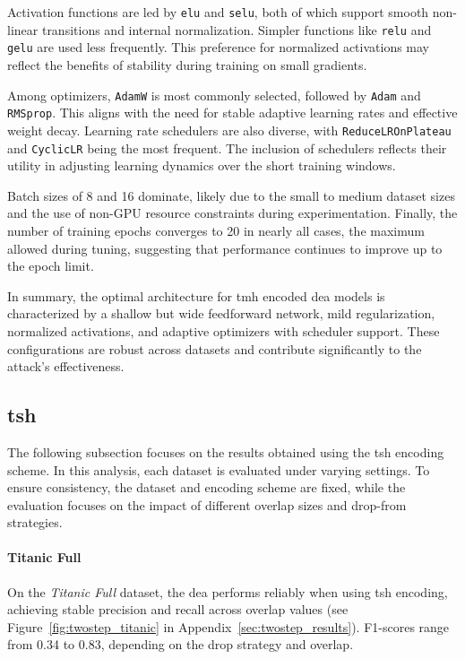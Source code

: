Activation functions are led by \texttt{elu} and \texttt{selu}, both of which support smooth non-linear transitions and internal normalization.
Simpler functions like \texttt{relu} and \texttt{gelu} are used less frequently.
This preference for normalized activations may reflect the benefits of stability during training on small gradients.

Among optimizers, \texttt{AdamW} is most commonly selected, followed by \texttt{Adam} and \texttt{\texttt{RMSprop}}.
This aligns with the need for stable adaptive learning rates and effective weight decay.
Learning rate schedulers are also diverse, with \texttt{ReduceLROnPlateau} and \texttt{CyclicLR} being the most frequent.
The inclusion of schedulers reflects their utility in adjusting learning dynamics over the short training windows.

Batch sizes of 8 and 16 dominate, likely due to the small to medium dataset sizes and the use of non-GPU resource constraints during experimentation.
Finally, the number of training epochs converges to 20 in nearly all cases, the maximum allowed during tuning, suggesting that performance continues to improve up to the epoch limit.

In summary, the optimal architecture for \ac{tmh} encoded \ac{dea} models is characterized by a shallow but wide feedforward network, mild regularization, normalized activations, and adaptive optimizers with scheduler support.
These configurations are robust across datasets and contribute significantly to the attack's effectiveness.

\subsection{\ac{tsh}}

The following subsection focuses on the results obtained using the \ac{tsh} encoding scheme.
In this analysis, each dataset is evaluated under varying settings.
To ensure consistency, the dataset and encoding scheme are fixed, while the evaluation focuses on the impact of different overlap sizes and drop-from strategies.

\paragraph{Titanic Full}

On the \textit{Titanic Full} dataset, the \ac{dea} performs reliably when using \ac{tsh} encoding, achieving stable precision and recall across overlap values (see Figure~\ref{fig:twostep_titanic} in Appendix~\ref{sec:twostep_results}).
F1-scores range from 0.34 to 0.83, depending on the drop strategy and overlap.


